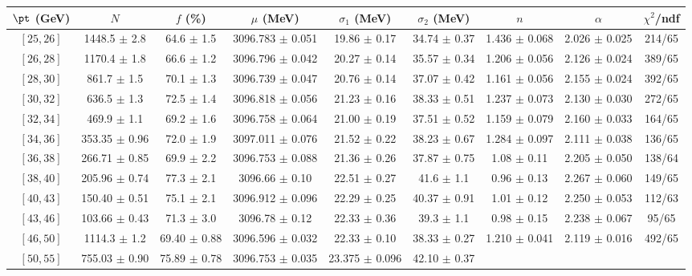 \begin{tabular}{c||c|c|c|c|c|c|c||c}
$\pt$ (GeV) & $N$ & $f$ (\%) & $\mu$ (MeV) & $\sigma_1$ (MeV) & $\sigma_2$ (MeV) & $n$ &  $\alpha$ & $\chi^2$/ndf \\
\hline
$[25, 26]$ & 1448.5 $\pm$ 2.8 & 
64.6 $\pm$ 1.5 & 
3096.783 $\pm$ 0.051 & 
19.86 $\pm$ 0.17 & 
34.74 $\pm$ 0.37 & 
1.436 $\pm$ 0.068 & 
2.026 $\pm$ 0.025 & 
214/65\\
$[26, 28]$ & 1170.4 $\pm$ 1.8 & 
66.6 $\pm$ 1.2 & 
3096.796 $\pm$ 0.042 & 
20.27 $\pm$ 0.14 & 
35.57 $\pm$ 0.34 & 
1.206 $\pm$ 0.056 & 
2.126 $\pm$ 0.024 & 
389/65\\
$[28, 30]$ & 861.7 $\pm$ 1.5 & 
70.1 $\pm$ 1.3 & 
3096.739 $\pm$ 0.047 & 
20.76 $\pm$ 0.14 & 
37.07 $\pm$ 0.42 & 
1.161 $\pm$ 0.056 & 
2.155 $\pm$ 0.024 & 
392/65\\
$[30, 32]$ & 636.5 $\pm$ 1.3 & 
72.5 $\pm$ 1.4 & 
3096.818 $\pm$ 0.056 & 
21.23 $\pm$ 0.16 & 
38.33 $\pm$ 0.51 & 
1.237 $\pm$ 0.073 & 
2.130 $\pm$ 0.030 & 
272/65\\
$[32, 34]$ & 469.9 $\pm$ 1.1 & 
69.2 $\pm$ 1.6 & 
3096.758 $\pm$ 0.064 & 
21.00 $\pm$ 0.19 & 
37.51 $\pm$ 0.52 & 
1.159 $\pm$ 0.079 & 
2.160 $\pm$ 0.033 & 
164/65\\
$[34, 36]$ & 353.35 $\pm$ 0.96 & 
72.0 $\pm$ 1.9 & 
3097.011 $\pm$ 0.076 & 
21.52 $\pm$ 0.22 & 
38.23 $\pm$ 0.67 & 
1.284 $\pm$ 0.097 & 
2.111 $\pm$ 0.038 & 
136/65\\
$[36, 38]$ & 266.71 $\pm$ 0.85 & 
69.9 $\pm$ 2.2 & 
3096.753 $\pm$ 0.088 & 
21.36 $\pm$ 0.26 & 
37.87 $\pm$ 0.75 & 
1.08 $\pm$ 0.11 & 
2.205 $\pm$ 0.050 & 
138/64\\
$[38, 40]$ & 205.96 $\pm$ 0.74 & 
77.3 $\pm$ 2.1 & 
3096.66 $\pm$ 0.10 & 
22.51 $\pm$ 0.27 & 
41.6 $\pm$ 1.1 & 
0.96 $\pm$ 0.13 & 
2.267 $\pm$ 0.060 & 
149/65\\
$[40, 43]$ & 150.40 $\pm$ 0.51 & 
75.1 $\pm$ 2.1 & 
3096.912 $\pm$ 0.096 & 
22.29 $\pm$ 0.25 & 
40.37 $\pm$ 0.91 & 
1.01 $\pm$ 0.12 & 
2.250 $\pm$ 0.053 & 
112/63\\
$[43, 46]$ & 103.66 $\pm$ 0.43 & 
71.3 $\pm$ 3.0 & 
3096.78 $\pm$ 0.12 & 
22.33 $\pm$ 0.36 & 
39.3 $\pm$ 1.1 & 
0.98 $\pm$ 0.15 & 
2.238 $\pm$ 0.067 & 
95/65\\
$[46, 50]$ & 1114.3 $\pm$ 1.2 & 
69.40 $\pm$ 0.88 & 
3096.596 $\pm$ 0.032 & 
22.33 $\pm$ 0.10 & 
38.33 $\pm$ 0.27 & 
1.210 $\pm$ 0.041 & 
2.119 $\pm$ 0.016 & 
492/65\\
$[50, 55]$ & 755.03 $\pm$ 0.90 & 
75.89 $\pm$ 0.78 & 
3096.753 $\pm$ 0.035 & 
23.375 $\pm$ 0.096 & 
42.10 $\pm$ 0.37 & 

\end{tabular}
